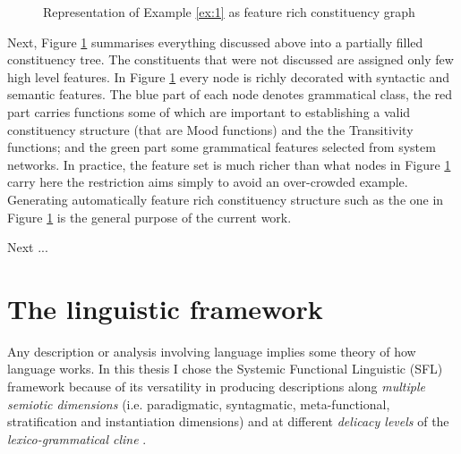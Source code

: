 \begin{figure}[!ht]
	\caption{Representation of Example \ref{ex:1} as feature rich constituency graph}
	\label{fig:mcg-graph-example}
\end{figure}


Next, Figure \ref{fig:mcg-graph-example} summarises everything discussed above into a partially filled constituency tree. The constituents that were not discussed are assigned only few high level features.
In Figure \ref{fig:mcg-graph-example} every node is richly decorated with syntactic and semantic features. The blue part of each node denotes grammatical class, the red part carries functions some of  which are important to establishing a valid constituency structure (that are Mood functions) and the the Transitivity functions; and the green part some grammatical features selected from system networks. In practice, the feature set is much richer than what nodes in Figure \ref{fig:mcg-graph-example} carry here the restriction aims simply to avoid an over-crowded example. Generating automatically feature rich constituency structure such as the one in Figure \ref{fig:mcg-graph-example} is the general purpose of the current work.

Next ...

\section{The linguistic framework}
Any description or analysis involving language implies some theory of how language works. In this thesis I chose the Systemic Functional Linguistic (SFL) framework because of its versatility in producing descriptions along \textit{multiple semiotic dimensions} \citep{Halliday2003} (i.e. paradigmatic, syntagmatic, meta-functional, stratification and instantiation dimensions) and at different \textit{delicacy levels} of the \textit{lexico-grammatical cline} \citep{Halliday2002, Hasan2014}. 

